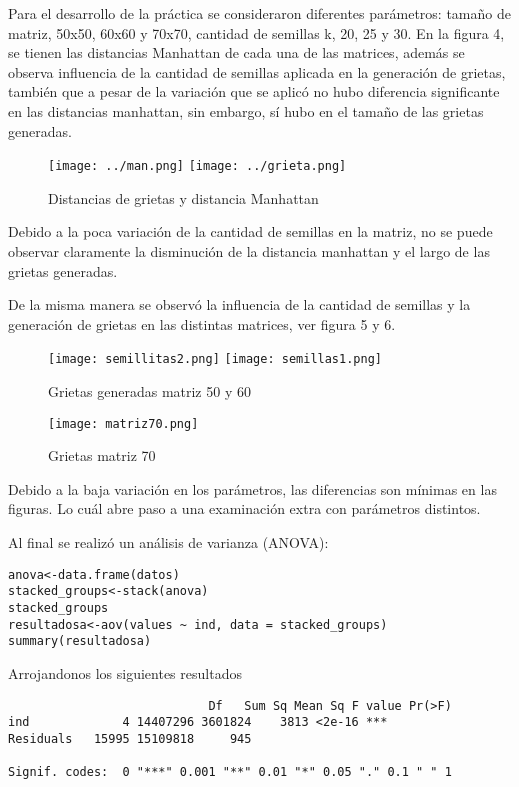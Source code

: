 \documentclass{article}
\begin{document}
Para el desarrollo de la práctica se consideraron diferentes parámetros: tamaño de matriz, 50x50, 60x60 y 70x70, cantidad de semillas k, 20, 25 y 30.
En la figura 4, se tienen las distancias Manhattan de cada una de las matrices, además se observa influencia de la cantidad de semillas aplicada en la generación de grietas, también que a pesar de la variación que se aplicó no hubo diferencia significante en las distancias manhattan, sin embargo, sí hubo en el tamaño de las grietas generadas.

\begin{figure}[H]                         \texttt{[image: ../man.png]} 
\centering
\texttt{[image: ../grieta.png]}
\caption{Distancias de grietas y distancia Manhattan}
\end{figure}

Debido a la poca variación de la cantidad de semillas en la matriz, no se puede observar claramente la disminución de la distancia manhattan y el largo de las grietas generadas.

De la misma manera se observó la influencia de la cantidad de semillas y la generación de grietas en las distintas matrices, ver figura 5 y 6.

\begin{figure}[H]                                        \texttt{[image: semillitas2.png]} 
\centering 
\texttt{[image: semillas1.png]}
\caption{Grietas generadas matriz 50 y 60}
\end{figure}

\begin{figure}[H]
\centering
\texttt{[image: matriz70.png]}
\caption{Grietas matriz 70}
\end{figure}

Debido a la baja variación en los parámetros, las diferencias son mínimas en las figuras. Lo cuál abre paso a una examinación extra con parámetros distintos. 

Al final se realizó un análisis de varianza (ANOVA):
\begin{lstlisting}
anova<-data.frame(datos)
stacked_groups<-stack(anova)
stacked_groups
resultadosa<-aov(values ~ ind, data = stacked_groups)
summary(resultadosa) 
\end{lstlisting}


Arrojandonos los siguientes resultados
\begin{lstlisting}
                            Df   Sum Sq Mean Sq F value Pr(>F)    
ind             4 14407296 3601824    3813 <2e-16 ***
Residuals   15995 15109818     945                   

Signif. codes:  0 "***" 0.001 "**" 0.01 "*" 0.05 "." 0.1 " " 1                  
\end{lstlisting}
\end{document}

